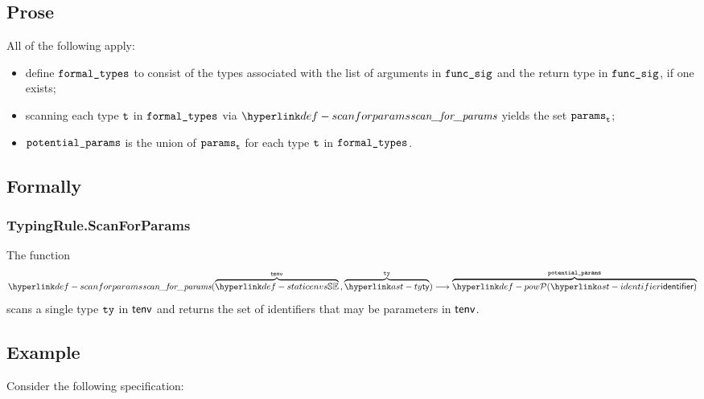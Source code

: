 \subsection{Prose}
All of the following apply:
\begin{itemize}
  \item define $\formaltypes$ to consist of the types associated with the list of arguments in $\funcsig$
        and the return type in $\funcsig$, if one exists;
  \item scanning each type $\vt$ in $\formaltypes$ via $\scanforparams$ yields the set $\vparams_\vt$;
  \item $\potentialparams$ is the union of $\vparams_\vt$ for each type $\vt$ in $\formaltypes$.
\end{itemize}

\subsection{Formally}
\begin{mathpar}
\end{mathpar}

\subsubsection{TypingRule.ScanForParams \label{sec:TypingRule.ScanForParams}}
\hypertarget{def-scanforparams}{}
The function
\[
\scanforparams(\overname{\staticenvs}{\tenv} \aslsep \overname{\ty}{\tty})
\aslto \overname{\pow{\identifier}}{\potentialparams}
\]
scans a single type $\tty$ in $\tenv$ and returns the set of
identifiers that may be parameters in $\tenv$.

\subsection{Example}
Consider the following specification:

